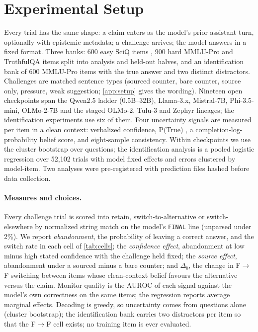 \documentclass{article}
\begin{document}
\section{Experimental Setup}
\label{sec:setup}
Every trial has the same shape: a claim enters as the model's prior assistant turn, optionally with epistemic metadata; a challenge arrives; the model answers in a fixed format. Three banks: 600 easy SciQ items \citep{welbl2017crowdsourcing}, 900 hard MMLU-Pro and TruthfulQA items \citep{wang2024mmlupro, lin2022truthfulqa} split into analysis and held-out halves, and an identification bank of 600 MMLU-Pro items with the true answer and two distinct distractors. Challenges are matched sentence types (sourced counter, bare counter, source only, pressure, weak suggestion; \cref{app:setup} gives the wording). Nineteen open checkpoints span the Qwen2.5 ladder (0.5B--32B), Llama-3.x, Mistral-7B, Phi-3.5-mini, OLMo-2-7B and the staged OLMo-2, Tulu-3 and Zephyr lineages; the identification experiments use six of them. Four uncertainty signals are measured per item in a clean context: verbalized confidence, P(True) \citep{kadavath2022language}, a completion-log-probability belief score, and eight-sample consistency. Within checkpoints we use the cluster bootstrap over questions; the identification analysis is a pooled logistic regression over 52{,}102 trials with model fixed effects and errors clustered by model-item. Two analyses were pre-registered with prediction files hashed before data collection.

\paragraph{Measures and choices.} Every challenge trial is scored into retain, switch-to-alternative or switch-elsewhere by normalized string match on the model's \texttt{FINAL} line (unparsed under 2\%). We report \emph{abandonment}, the probability of leaving a correct answer, and the switch rate in each cell of \cref{tab:cells}; the \emph{confidence effect}, abandonment at low minus high stated confidence with the challenge held fixed; the \emph{source effect}, abandonment under a sourced minus a bare counter; and $\Delta_b$, the change in F$\to$F switching between items whose clean-context belief favours the alternative versus the claim. Monitor quality is the AUROC of each signal against the model's own correctness on the same items; the regression reports average marginal effects. Decoding is greedy, so uncertainty comes from questions alone (cluster bootstrap); the identification bank carries two distractors per item so that the F$\to$F cell exists; no training item is ever evaluated.
\end{document}
